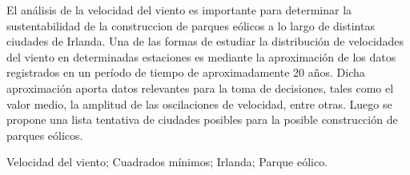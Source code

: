 \documentclass[journal, monochrome]{IEEEtran}
\begin{document}












\maketitle

\renewcommand{\abstractname}{Abstract}

El análisis de la velocidad del viento es importante para determinar la sustentabilidad de la construccion de parques eólicos a lo largo de distintas ciudades de Irlanda. 
Una de las formas de estudiar la distribución de velocidades del viento en determinadas estaciones es mediante la aproximación de los datos registrados en un período de tiempo de aproximadamente 20 años. Dicha aproximación aporta datos relevantes para la toma de decisiones, tales como el valor medio, la amplitud de las oscilaciones de velocidad, entre otras. 
Luego se propone una lista tentativa de ciudades posibles para la posible construcción de parques eólicos. 


\renewcommand{\IEEEkeywordsname}{Palabras clave}
\renewcommand{\refname}{Referencias}
\renewcommand{\tablename}{Tabla}

\begin{abstract}
\boldmath

\end{abstract}

\begin{IEEEkeywords}
Velocidad del viento; Cuadrados mínimos; Irlanda; Parque eólico.
\end{IEEEkeywords}






\end{document}
